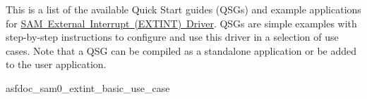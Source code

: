 This is a list of the available Quick Start guides (Q\+S\+Gs) and example applications for \mbox{\hyperlink{group__asfdoc__sam0__extint__group}{S\+AM External Interrupt (E\+X\+T\+I\+NT) Driver}}. Q\+S\+Gs are simple examples with step-\/by-\/step instructions to configure and use this driver in a selection of use cases. Note that a Q\+SG can be compiled as a standalone application or be added to the user application.


\begin{DoxyItemize}
\item asfdoc\+\_\+sam0\+\_\+extint\+\_\+basic\+\_\+use\+\_\+case 
\end{DoxyItemize}